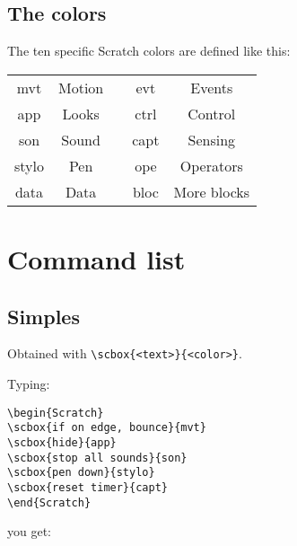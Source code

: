 \documentclass[a4paper,11pt]{article}
\begin{document}
\subsection*{The colors}
The ten specific Scratch colors are defined like this:
\begin{center}
\begin{tabular}{c@{:\quad}cp{1cm}c@{:\quad }c}\hline
mvt&\textcolor{mvt}{Motion}&&evt&\textcolor{evt}{Events}\\
app&\textcolor{app}{Looks}&&ctrl&\textcolor{ctrl}{Control}\\
son&\textcolor{son}{Sound}&&capt&\textcolor{capt}{Sensing}\\
stylo&\textcolor{stylo}{Pen}&&ope&\textcolor{ope}{Operators}\\
data&\textcolor{data}{Data}&&bloc&\textcolor{bloc}{More blocks}\\\hline
\end{tabular}
\end{center}

\newpage
\section{Command list}

\subsection{Simples}
Obtained with \texttt{\textbackslash scbox\{<text>\}\{<color>\}}.

Typing:
\begin{verbatim}
\begin{Scratch}
\scbox{if on edge, bounce}{mvt}
\scbox{hide}{app}
\scbox{stop all sounds}{son}
\scbox{pen down}{stylo}
\scbox{reset timer}{capt}
\end{Scratch}
\end{verbatim}

you get:\\

\begin{Scratch}
\end{Scratch}
\end{document}
